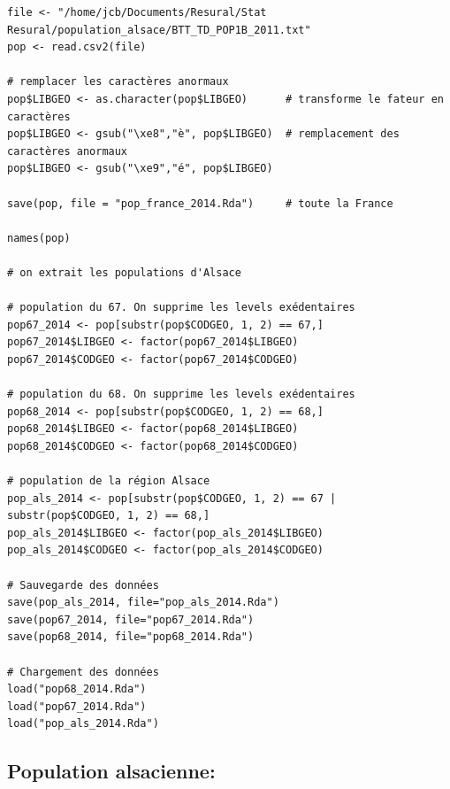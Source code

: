 \documentclass[]{article}
\begin{document}
\begin{verbatim}
file <- "/home/jcb/Documents/Resural/Stat Resural/population_alsace/BTT_TD_POP1B_2011.txt"
pop <- read.csv2(file)

# remplacer les caractères anormaux
pop$LIBGEO <- as.character(pop$LIBGEO)      # transforme le fateur en caractères
pop$LIBGEO <- gsub("\xe8","è", pop$LIBGEO)  # remplacement des caractères anormaux
pop$LIBGEO <- gsub("\xe9","é", pop$LIBGEO)

save(pop, file = "pop_france_2014.Rda")     # toute la France

names(pop)

# on extrait les populations d'Alsace

# population du 67. On supprime les levels exédentaires
pop67_2014 <- pop[substr(pop$CODGEO, 1, 2) == 67,]
pop67_2014$LIBGEO <- factor(pop67_2014$LIBGEO)
pop67_2014$CODGEO <- factor(pop67_2014$CODGEO)

# population du 68. On supprime les levels exédentaires
pop68_2014 <- pop[substr(pop$CODGEO, 1, 2) == 68,]
pop68_2014$LIBGEO <- factor(pop68_2014$LIBGEO)
pop68_2014$CODGEO <- factor(pop68_2014$CODGEO)

# population de la région Alsace
pop_als_2014 <- pop[substr(pop$CODGEO, 1, 2) == 67 | substr(pop$CODGEO, 1, 2) == 68,]
pop_als_2014$LIBGEO <- factor(pop_als_2014$LIBGEO)
pop_als_2014$CODGEO <- factor(pop_als_2014$CODGEO)

# Sauvegarde des données
save(pop_als_2014, file="pop_als_2014.Rda")
save(pop67_2014, file="pop67_2014.Rda")
save(pop68_2014, file="pop68_2014.Rda")

# Chargement des données
load("pop68_2014.Rda")
load("pop67_2014.Rda")
load("pop_als_2014.Rda")
\end{verbatim}

\subsection{Population alsacienne:}\label{population-alsacienne}
\end{document}
